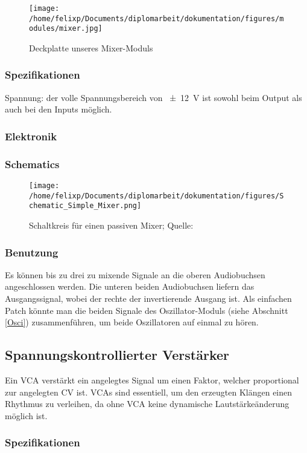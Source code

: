 \begin{figure}[htbp]
\centering
\texttt{[image: /home/felixp/Documents/diplomarbeit/dokumentation/figures/modules/mixer.jpg]}
\caption{Deckplatte unseres Mixer-Moduls}
\end{figure}

\subsubsection{Spezifikationen}
\label{sec:org76df691}
Spannung: der volle Spannungsbereich von \SI{\pm12}{\volt} ist sowohl beim Output als auch bei den Inputs möglich.

\subsubsection{Elektronik}
\label{sec:org373afc9}
\cite{miaw:mixer}
\subsubsection{Schematics}
\label{sec:org11470d9}

\begin{figure}[htbp]
\centering
\texttt{[image: /home/felixp/Documents/diplomarbeit/dokumentation/figures/Schematic\_Simple\_Mixer.png]}
\caption{Schaltkreis für einen passiven Mixer; Quelle: \cite{miaw:mixer}}
\end{figure}
\subsubsection{Benutzung}
\label{sec:orgadc871e}
Es können bis zu drei zu mixende Signale an die oberen Audiobuchsen angeschlossen werden. Die unteren beiden Audiobuchsen liefern das Ausgangssignal, wobei der rechte der invertierende Ausgang ist. Als einfachen Patch könnte man die beiden Signale des Oszillator-Moduls (siehe Abschnitt \ref{Osci}) zusammenführen, um beide Oszillatoren auf einmal zu hören.
\subsection{Spannungskontrollierter Verstärker \label{VCA}}
\label{sec:org6227b08}
Ein \acf{VCA} verstärkt ein angelegtes Signal um einen Faktor, welcher proportional zur angelegten \acl{CV} ist. \acp{VCA} sind essentiell, um den erzeugten Klängen einen Rhythmus zu verleihen, da ohne \ac{VCA} keine dynamische Lautstärkeänderung möglich ist. 
\subsubsection{Spezifikationen}
\label{sec:orge26fc09}

